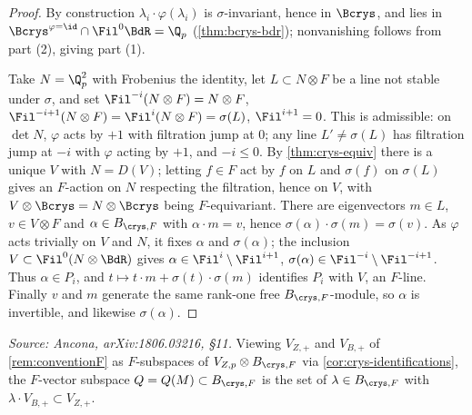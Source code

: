 \begin{proof}
  By construction \(\lambda_i \cdot \varphi(\lambda_i)\) is \(\sigma\)-invariant,
  hence in \(\Bcrys\), and lies in \(\Bcrys^{\varphi=\id} \cap \Fil^0 \BdR =
  \Q_p\) (\cref{thm:bcrys-bdr}); nonvanishing follows from part (2), giving part
  (1).

  Take \(N = \Q_p^2\) with Frobenius the identity, let \(L \subset N \otimes F\)
  be a line not stable under \(\sigma\), and set \(\Fil^{-i}(N \otimes F) =
  N \otimes F\), \(\Fil^{-i+1}(N \otimes F) = \Fil^i(N \otimes F) = \sigma(L)\),
  \(\Fil^{i+1} = 0\). This is admissible: on \(\det N\), \(\varphi\) acts by
  \(+1\) with filtration jump at \(0\); any line \(L' \neq \sigma(L)\) has
  filtration jump at \(-i\) with \(\varphi\) acting by \(+1\), and \(-i \leq 0\).
  By \cref{thm:crys-equiv} there is a unique \(V\) with \(N = D(V)\); letting
  \(f \in F\) act by \(f\) on \(L\) and \(\sigma(f)\) on \(\sigma(L)\) gives an
  \(F\)-action on \(N\) respecting the filtration, hence on \(V\), with
  \(V \otimes \Bcrys = N \otimes \Bcrys\) being \(F\)-equivariant. There are
  eigenvectors \(m \in L\), \(v \in V \otimes F\) and \(\alpha \in B_{\crys,F}\)
  with \(\alpha \cdot m = v\), hence \(\sigma(\alpha) \cdot \sigma(m) =
  \sigma(v)\). As \(\varphi\) acts trivially on \(V\) and \(N\), it fixes
  \(\alpha\) and \(\sigma(\alpha)\); the inclusion \(V \subset \Fil^0(N \otimes
  \BdR)\) gives \(\alpha \in \Fil^i \setminus \Fil^{i+1}\),
  \(\sigma(\alpha) \in \Fil^{-i} \setminus \Fil^{-i+1}\). Thus \(\alpha \in P_i\),
  and \(t \mapsto t \cdot m + \sigma(t) \cdot \sigma(m)\) identifies \(P_i\) with
  \(V\), an \(F\)-line. Finally \(v\) and \(m\) generate the same rank-one free
  \(B_{\crys,F}\)-module, so \(\alpha\) is invertible, and likewise
  \(\sigma(\alpha)\).
\end{proof}

\begin{definition}
  \label{def:Q-ram}
  \textit{Source: Ancona, arXiv:1806.03216, \S11.}
  Viewing \(V_{Z,+}\) and \(V_{B,+}\) of \cref{rem:conventionF} as \(F\)-subspaces
  of \(V_{Z,p} \otimes B_{\crys,F}\) via \cref{cor:crys-identifications}, the
  \(F\)-vector subspace \(Q = Q(M) \subset B_{\crys,F}\) is the set of
  \(\lambda \in B_{\crys,F}\) with \(\lambda \cdot V_{B,+} \subset V_{Z,+}\).
\end{definition}

